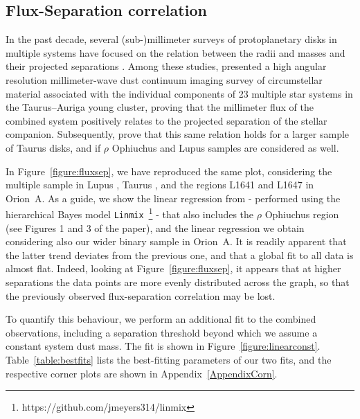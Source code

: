 \documentclass{aa}
\begin{document}
\subsection{Flux-Separation correlation} \label{section:fluxseparation}
In the past decade, several (sub-)millimeter surveys of protoplanetary disks in multiple systems have focused on the relation between the radii and masses and their projected separations \citep[e.g.,][]{Zagaria21, Manara19, Ansdell16}. Among these studies, \cite{Harris_2012} presented a high angular resolution millimeter-wave dust continuum imaging survey of circumstellar material associated with the individual components of 23 multiple star systems in the Taurus–Auriga young cluster, proving that the millimeter flux of the combined system positively relates to the projected separation of the stellar companion. Subsequently, \cite{Zagaria21} prove that this same relation holds for a larger sample of Taurus disks, and if $\rho$ Ophiuchus and Lupus samples are considered as well. \par
In Figure~\ref{figure:fluxsep}, we have reproduced the same plot, considering the multiple sample in Lupus \citep{Zurlo21, Ansdell18}, Taurus \citep{Akeson19, Manara19, Akeson14, Harris_2012}, and the regions L1641 and L1647 in Orion~A. As a guide, we show the linear regression from \cite{Zagaria21} - performed using the hierarchical Bayes model \texttt{Linmix}~\footnote{https://github.com/jmeyers314/linmix} \citep{Kelly_2007} -  that also includes the $\rho$ Ophiuchus region (see Figures 1 and 3 of the paper), and the linear regression we obtain considering also our wider binary sample in Orion~A. It is readily apparent that the latter trend deviates from the previous one, and that a global fit to all data is almost flat. 
Indeed, looking at Figure~\ref{figure:fluxsep}, it appears that at higher separations the data points are more evenly distributed across the graph, so that the previously observed flux-separation correlation may be lost. \par
To quantify this behaviour, we perform an additional fit to the combined observations, including a separation threshold beyond which we assume a constant system dust mass. The fit is shown in Figure~\ref{figure:linearconst}. Table~\ref{table:bestfits} lists the best-fitting parameters of our two fits, and the respective corner plots are shown in Appendix~\ref{AppendixCorn}. 
\end{document}
